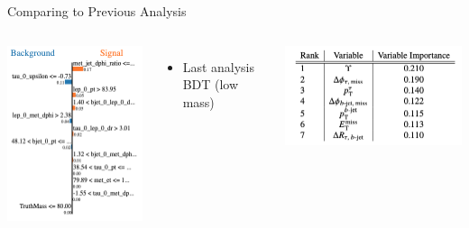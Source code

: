 \documentclass[aspectratio=169,xcolor=table]{beamer}
\begin{document}
\begin{frame}{Comparing to Previous Analysis}
\begin{columns}[t]
        \includegraphics[width=.9\linewidth,keepaspectratio=true]{PawelModel_HPlus80_SIG.png}
        \begin{itemize}
          \item Last analysis BDT (low mass)
        \end{itemize}
        \includegraphics[width=.9\linewidth,keepaspectratio=true]{IntNotefeatureRanking.png}

      \end{columns}
    \end{frame}
\end{document}
